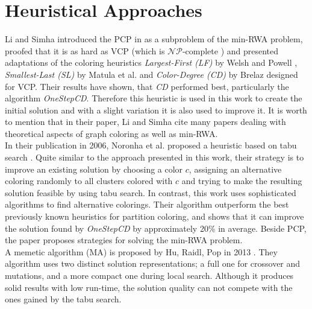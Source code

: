 \section{Heuristical Approaches}
Li and Simha introduced the PCP in \cite{li-00} as a subproblem of the min-RWA problem, proofed that it is as hard as VCP (which is $\mathcal{NP}$-complete \cite{karp-72}) and presented adaptations of the coloring heuristics \textit{Largest-First (LF)} by Welsh and Powell \cite{welsh-67}, \textit{Smallest-Last (SL)} by Matula et al. \cite{matula-72} and \textit{Color-Degree (CD)} by Brelaz \cite{brelaz-79} designed for VCP. Their results have shown, that \textit{CD} performed best, particularly the algorithm \textit{OneStepCD}. Therefore this heuristic is used in this work to create the initial solution and with a slight variation it is also used to improve it. It is worth to mention that in their paper, Li and Simha cite many papers dealing with theoretical aspects of graph coloring as well as min-RWA.\\
In their publication in 2006, Noronha et al. proposed a heuristic based on tabu search \cite{noronha-06}. Quite similar to the approach presented in this work, their strategy is to improve an existing solution by choosing a color $c$, assigning an alternative coloring randomly to all clusters colored with $c$ and trying to make the resulting solution feasible by using tabu search. In contrast, this work uses sophisticated algorithms to find alternative colorings. Their algorithm outperform the best previously known heuristics for partition coloring, and shows that it can improve the solution found by \textit{OneStepCD} by approximately 20\% in average. Beside PCP, the paper proposes  strategies for solving the min-RWA problem.\\
A memetic algorithm (MA) is proposed by Hu, Raidl, Pop in 2013 \cite{pop-12}. They algorithm uses two distinct solution representations; a full one for crossover and mutations, and a more compact one during local search. Although it produces solid results with low run-time, the solution quality can not compete with the ones gained by the tabu search.
